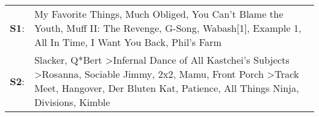 \begin{supertabular}{p{0.03\textwidth}p{0.92\textwidth}}
 \textbf{S1}:  &                                                                                                                                                                                                                   My Favorite Things\textsuperscript{}, \enspace Much Obliged\textsuperscript{}, \enspace You Can't Blame the Youth\textsuperscript{}, \enspace Muff II: The Revenge\textsuperscript{}, \enspace G-Song\textsuperscript{}, \enspace Wabash[1]\textsuperscript{}, \enspace Example 1\textsuperscript{}, \enspace All In Time\textsuperscript{}, \enspace I Want You Back\textsuperscript{}, \enspace Phil's Farm\textsuperscript{}  \enspace  \\
 \textbf{S2}:  &  Slacker\textsuperscript{}, \enspace Q*Bert\textsuperscript{} \textgreater \enspace Infernal Dance of All Kastchei's Subjects\textsuperscript{} \textgreater \enspace Rosanna\textsuperscript{}, \enspace Sociable Jimmy\textsuperscript{}, \enspace 2x2\textsuperscript{}, \enspace Mamu\textsuperscript{}, \enspace Front Porch\textsuperscript{} \textgreater \enspace Track Meet\textsuperscript{}, \enspace Hangover\textsuperscript{}, \enspace Der Bluten Kat\textsuperscript{}, \enspace Patience\textsuperscript{}, \enspace All Things Ninja\textsuperscript{}, \enspace Divisions\textsuperscript{}, \enspace Kimble\textsuperscript{}  \enspace  \\
\end{supertabular}
